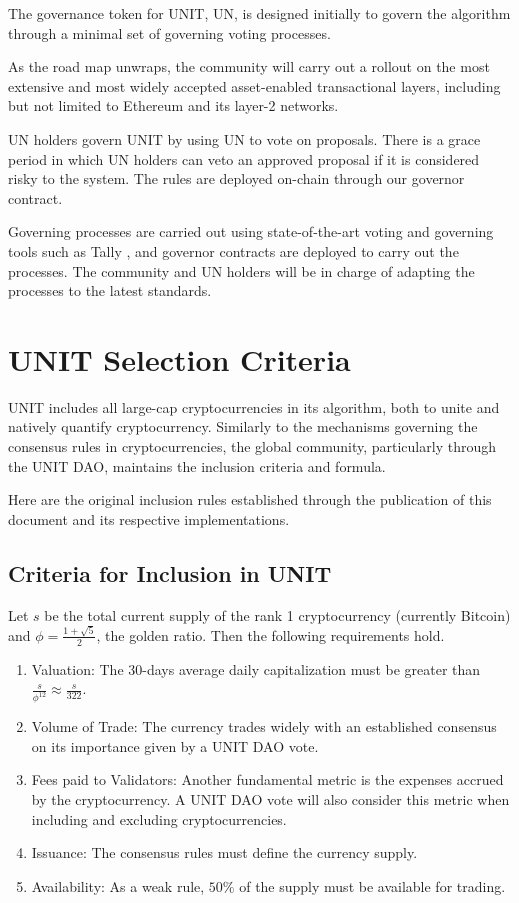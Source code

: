 \documentclass[12pt]{article}
\begin{document}
The governance token for UNIT, UN, is designed initially to govern the algorithm through a minimal set of governing voting processes. 

As the road map unwraps, the community will carry out a rollout on the most extensive and most widely accepted asset-enabled transactional layers, including but not limited to Ethereum and its layer-2 networks.

UN holders govern UNIT by using UN to vote on proposals. There is a grace period in which UN holders can veto an approved proposal if it is considered risky to the system. The rules are deployed on-chain through our governor contract.

Governing processes are carried out using state-of-the-art voting and governing tools such as Tally \cite{tally2023documentation}, and governor contracts are deployed to carry out the processes. The community and UN holders will be in charge of adapting the processes to the latest standards.


\section{UNIT Selection Criteria}
\label{sec:selectionCriteria}

UNIT includes all large-cap cryptocurrencies in its algorithm, both to unite and natively quantify cryptocurrency. Similarly to the mechanisms governing the consensus rules in cryptocurrencies, the global community, particularly through the UNIT DAO, maintains the inclusion criteria and formula.

Here are the original inclusion rules established through the publication of this document and its respective implementations. 

\subsection{Criteria for Inclusion in UNIT}

Let $s$ be the total current supply of the rank 1 cryptocurrency (currently Bitcoin) and $\displaystyle{\phi =\frac{1+\sqrt{5}}{2}}$, the golden ratio. Then the following requirements hold.

\begin{enumerate}

\item Valuation: The 30-days average daily capitalization must be greater than $\displaystyle{\frac{s}{\phi^{12}}\approx\frac{s}{322}}$.
\item Volume of Trade: The currency trades widely with an established consensus on its importance given by a UNIT DAO vote.
\item Fees paid to Validators: Another fundamental metric is the expenses accrued by the cryptocurrency. A UNIT DAO vote will also consider this metric when including and excluding cryptocurrencies.
\item Issuance: The consensus rules must define the currency supply.
\item Availability: As a weak rule, $50\%$ of the supply must be available for trading.

\end{enumerate}
\end{document}
